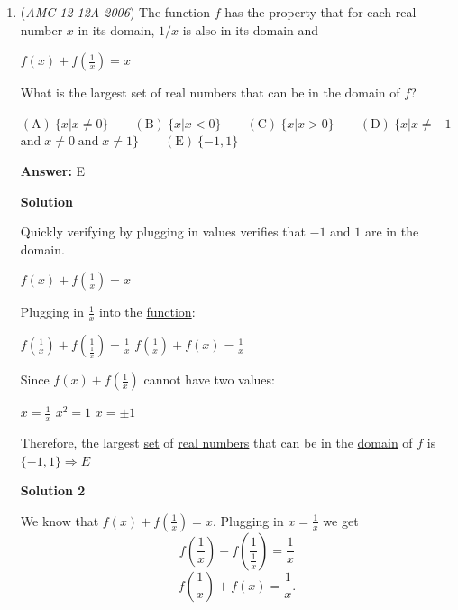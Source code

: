 \begin{enumerate}
(Last minute solution) We roughly measure the distance of $r$ and the distance of $y$. Since $r$ is clearly less than $s$, we can eliminate answer choices (D) and (E). Next, if we compare the distances, $r$ seems to be just a little more than half of $s$, thus eliminating answer choice (A). $r$ is only a little bit bigger than half of $s$, so we can reasonably assume that their ratio is less than $\frac{3}{5}$. That leaves us with answer choice $\boxed{B}$ , or $\frac{5}{9}$.

 


	\item (\textit{AMC 12 12A 2006}) The function $f$ has the property that for each real number $x$ in its domain, $1/x$ is also in its domain and 


 $f(x)+f\left(\frac{1}{x}\right)=x$


 What is the largest set of real numbers that can be in the domain of $f$?


 $\mathrm{(A) \ } \{x|x\ne 0\}\qquad \mathrm{(B) \ } \{x|x<0\}\qquad \mathrm{(C) \ } \{x|x>0\}\qquad \mathrm{(D) \ } \{x|x\ne -1\;$ $\mathrm{and}\; x\ne 0\;\mathrm{and}\; x\ne 1\}\qquad \mathrm{(E) \ }  \{-1,1\}$

 \textbf{Answer: }E



\textbf{Solution}

Quickly verifying by plugging in values verifies that $-1$ and $1$ are in the domain.

 $f(x)+f\left(\frac{1}{x}\right)=x$

 Plugging in $\frac{1}{x}$ into the \href{https://artofproblemsolving.com/wiki/index.php?title=Function}{function}: 

 $f\left(\frac{1}{x}\right)+f\left(\frac{1}{\frac{1}{x}}\right)=\frac{1}{x}$
$f\left(\frac{1}{x}\right)+ f(x)= \frac{1}{x}$

 Since $f(x) + f\left(\frac{1}{x}\right)$ cannot have two values: 

 $x = \frac{1}{x}$
$x^2 = 1$
$x=\pm 1$

 Therefore, the largest \href{https://artofproblemsolving.com/wiki/index.php?title=Set}{set} of \href{https://artofproblemsolving.com/wiki/index.php?title=Real\_number}{real numbers} that can be in the \href{https://artofproblemsolving.com/wiki/index.php?title=Domain}{domain} of $f$ is $\{-1,1\} \Rightarrow E$




\textbf{Solution 2}

We know that $f(x) + f \left(\frac{1}{x}\right) = x.$ Plugging in $x = \frac{1}{x}$ we get 
 \[f \left(\frac{1}{x}\right) + f \left(\frac{1}{\frac{1}{x}}\right) = \frac{1}{x}\] 
 \[f \left(\frac{1}{x}\right) + f(x) = \frac{1}{x}.\]


\end{enumerate}
